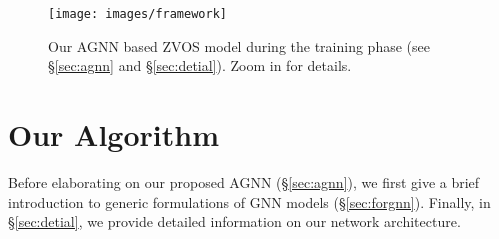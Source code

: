 \documentclass[10pt,twocolumn,letterpaper]{article}
\begin{document}
\begin{figure*}[t]
\centering
      \texttt{[image: images/framework]}
\vspace{-20pt}
\caption{\small Our AGNN based ZVOS model during the training phase (see \S\ref{sec:agnn} and \S\ref{sec:detial}). \small Zoom in for details. }
\label{fig:model}
\vspace{-12pt}
\end{figure*}

\vspace*{-4pt}
\section{Our Algorithm}
\vspace*{-4pt}	
Before elaborating on our proposed AGNN (\S\ref{sec:agnn}), we first give a brief introduction to generic formulations of GNN models (\S\ref{sec:forgnn}). Finally, in \S\ref{sec:detial}, we provide detailed information on our network architecture.
	\vspace*{-3pt}
\end{document}
